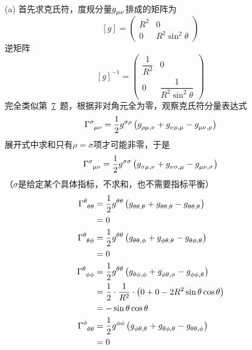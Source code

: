 \begin{xiti}
    \begin{jie}
    	\begin{enumerate}
    		\item[(a)] 首先求克氏符，度规分量$\tensor{g}{_\mu_\nu}$排成的矩阵为
    		\begin{displaymath}
    		\left[g\right]=\left(
    		\begin{array}{cc}
    		R^2&0\\
    		0&R^2 \sin^2\theta 
    		\end{array}
    		\right)
    		\end{displaymath}
    		逆矩阵
    		\begin{displaymath}
    		\left[g\right]^{-1}=\left(
    		\begin{array}{cc}
    		\dfrac{1}{R^2}&0\\
    		0&\dfrac{1}{R^2 \sin^2\theta} 
    		\end{array}
    		\right)
    		\end{displaymath}
    		完全类似第~\hyperlink{3.7}{7}~题，根据非对角元全为零，观察克氏符分量表达式
    		\begin{displaymath}
    		\ChristoffelSymbol{\sigma}{\mu}{\nu}=\christoffelSymbol{\sigma}{\mu}{\nu}{\rho}
    		\end{displaymath}
    		展开式中求和只有$\rho=\sigma$项才可能非零，于是
    		\begin{displaymath}
    		\ChristoffelSymbol{\sigma}{\mu}{\nu}=\christoffelSymbol{\sigma}{\mu}{\nu}{\sigma}
    		\end{displaymath}
    		（$\sigma$是给定某个具体指标，不求和，也不需要指标平衡）
    		\begin{align*}
    		\ChristoffelSymbol{\theta}{\theta}{\theta}&= \christoffelSymbol{\theta}{\theta}{\theta}{\theta}\\
    		&=0\\
    		\ChristoffelSymbol{\theta}{\theta}{\phi}&= \christoffelSymbol{\theta}{\theta}{\phi}{\theta}\\
    		&=0\\
    		\ChristoffelSymbol{\theta}{\phi}{\phi}&= \christoffelSymbol{\theta}{\phi}{\phi}{\theta}\\
    		&=\frac{1}{2}\cdot \frac{1}{R^2} \cdot \left( 0+0-2 R^2 \sin \theta \cos \theta \right)\\
    		&=-\sin\theta\cos\theta\\
    		\ChristoffelSymbol{\phi}{\theta}{\theta}&= \christoffelSymbol{\phi}{\theta}{\theta}{\phi}\\
    		&=0\\

\end{align*}
\end{enumerate}
\end{jie}
\end{xiti}
